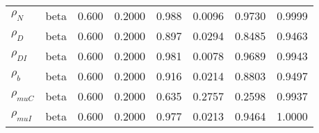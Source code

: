 \begin{center}
\begin{longtable}{llcccccc}
${\rho_N}$ & beta &   0.600 & 0.2000 &   0.988& 0.0096 &  0.9730 &  0.9999 \\ 
${\rho_D}$ & beta &   0.600 & 0.2000 &   0.897& 0.0294 &  0.8485 &  0.9463 \\ 
${\rho_{DI}}$ & beta &   0.600 & 0.2000 &   0.981& 0.0078 &  0.9689 &  0.9943 \\ 
${\rho_b}$ & beta &   0.600 & 0.2000 &   0.916& 0.0214 &  0.8803 &  0.9497 \\ 
${\rho_{muC}}$ & beta &   0.600 & 0.2000 &   0.635& 0.2757 &  0.2598 &  0.9937 \\ 
${\rho_{muI}}$ & beta &   0.600 & 0.2000 &   0.977& 0.0213 &  0.9464 &  1.0000 \\ 
\end{longtable}
 \end{center}
